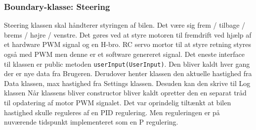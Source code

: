 \subsubsection{Boundary-klasse: Steering} %


Steering klassen skal håndterer styringen af bilen. Det være sig frem / tilbage / brems / højre / venstre.
Det gøres ved at styre motoren til fremdrift ved hjælp af et hardware PWM signal og en H-bro. 
RC servo mortor til at styre retning styres også med PWM men denne er et software genereret signal. 
Det eneste interface til klassen er public metoden \texttt{userInput(UserInput)}. 
Den bliver kaldt hver gang der er nye data fra Brugeren. Derudover henter klassen den aktuelle hastighed fra Data klassen, max hastighed fra Settings klassen. Desuden kan den skrive til Log klassen
Når klassens bliver constructor bliver kaldt opretter den en separat tråd til opdatering af motor PWM signalet. Det var oprindelig tiltænkt at bilen hastighed skulle reguleres af en PID regulering. Men reguleringen er på nuværende tidspunkt implementeret som en P regulering.